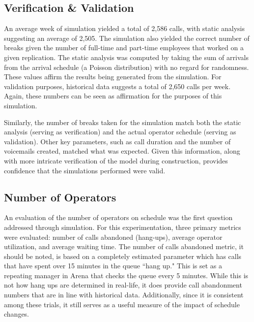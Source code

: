 \documentclass[12pt]{article}
\begin{document}
	\subsection{Verification \& Validation}
	
	  An average week of simulation yielded a total of 2,586 calls, with static analysis suggesting an average of 2,505.  The simulation also yielded the correct number of breaks given the number of full-time and part-time employees that worked on a given replication.  The static analysis was computed by taking the sum of arrivals from the arrival schedule (a Poisson distribution) with no regard for randomness.  These values affirm the results being generated from the simulation.  For validation purposes, historical data suggests a total of 2,650 calls per week.  Again, these numbers can be seen as affirmation for the purposes of this simulation.
	  
	  \par
	  
	  Similarly, the number of breaks taken for the simulation match both the static analysis (serving as verification) and the actual operator schedule (serving as validation).  Other key parameters, such as call duration and the number of voicemails created, matched what was expected.  Given this information, along with more intricate verification of the model during construction, provides confidence that the simulations performed were valid.
	  
	  
	\subsection{Number of Operators}
	
	An evaluation of the number of operators on schedule was the first question addressed through simulation.  For this experimentation, three primary metrics were evaluated:  number of calls abandoned (hang-ups), average operator utilization, and average waiting time.  The number of calls abandoned metric, it should be noted, is based on a completely estimated parameter which has calls that have spent over 15 minutes in the queue ``hang up."  This is set as a repeating manager in Arena that checks the queue every 5 minutes.  While this is not how hang ups are determined in real-life, it does provide call abandonment numbers that are in line with historical data.  Additionally, since it is consistent among these trials, it still serves as a useful measure of the impact of schedule changes.
	
\end{document}
